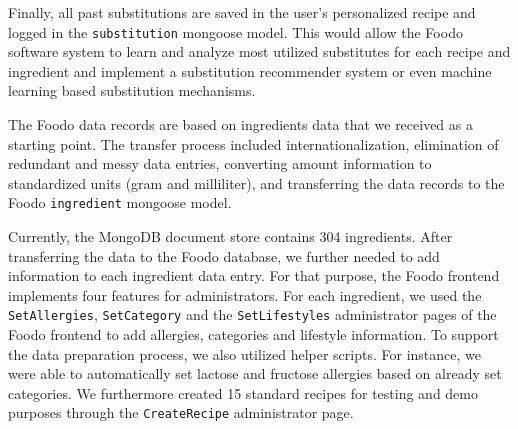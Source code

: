 Finally, all past substitutions are saved in the user's personalized recipe and logged in the \texttt{substitution} mongoose model. This would allow the Foodo software system to learn and analyze most utilized substitutes for each recipe and ingredient and implement a substitution recommender system or even machine learning based substitution mechanisms. 


The Foodo data records are based on ingredients data that we received as a starting point. The transfer process included internationalization, elimination of redundant and messy data entries, converting amount information to standardized units (gram and milliliter), and transferring the data records to the Foodo \texttt{ingredient} mongoose model. 

Currently, the MongoDB document store contains 304 ingredients. After transferring the data to the Foodo database, we further needed to add information to each ingredient data entry. For that purpose, the Foodo frontend implements four features for administrators. For each ingredient, we used the \texttt{SetAllergies}, \texttt{SetCategory} and the \texttt{SetLifestyles} administrator pages of the Foodo frontend to add allergies, categories and lifestyle information. To support the data preparation process, we also utilized helper scripts. For instance, we were able to automatically set lactose and fructose allergies based on already set categories. We furthermore created 15 standard recipes for testing and demo purposes through the \texttt{CreateRecipe} administrator page.